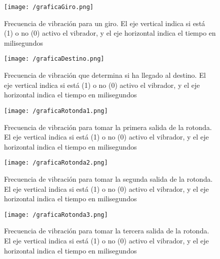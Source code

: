 \begin{figure}[!h]
  \begin{center}
    \texttt{[image: /graficaGiro.png]}
    \caption{Frecuencia de vibración para un giro. El eje vertical indica si está (1) o no (0)
      activo el vibrador, y el eje horizontal indica el tiempo en milisegundos}
    \label{fig:graficaGiro}
  \end{center}
\end{figure}

\begin{figure}[!h]
  \begin{center}
    \texttt{[image: /graficaDestino.png]}
    \caption{Frecuencia de vibración que determina si ha llegado al destino. El eje vertical indica
      si está (1) o no (0) activo el vibrador, y el eje horizontal indica el tiempo en milisegundos}
    \label{fig:graficaDestino}
  \end{center}
\end{figure}

\begin{figure}[!h]
  \begin{center}
    \texttt{[image: /graficaRotonda1.png]}
    \caption{Frecuencia de vibración para tomar la primera salida de la rotonda. El eje vertical
      indica si está (1) o no (0) activo el vibrador, y el eje horizontal indica el tiempo en
      milisegundos}
    \label{fig:graficaRotonda1}
  \end{center}
\end{figure}

\begin{figure}[!h]
  \begin{center}
    \texttt{[image: /graficaRotonda2.png]}
    \caption{Frecuencia de vibración para tomar la segunda salida de la rotonda. El eje vertical
      indica si está (1) o no (0) activo el vibrador, y el eje horizontal indica el tiempo en
      milisegundos}
    \label{fig:graficaRotonda2}
  \end{center}
\end{figure}

\begin{figure}[!h]
  \begin{center}
    \texttt{[image: /graficaRotonda3.png]}
    \caption{Frecuencia de vibración para tomar la tercera salida de la rotonda. El eje vertical
      indica si está (1) o no (0) activo el vibrador, y el eje horizontal indica el tiempo en
      milisegundos}
    \label{fig:graficaRotonda3}
  \end{center}
\end{figure}

